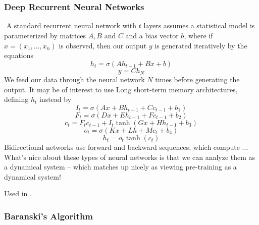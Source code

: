 \documentclass{article}
\begin{document}
​
%
​

​
\subsubsection{Deep Recurrent Neural Networks}
​
A standard recurrent neural network with $t$ layers assumes a statistical model is parameterized by matrices $A,B$ and $C$ and a bias vector $b$, where if $x = (x_1, \dots, x_n)$ is observed, then our output $y$ is generated iteratively by the equations
%
\[ h_t = \sigma(A h_{t-1} + B x + b) \]
%
\[ y = C h_N \]
%
We feed our data through the neural network $N$ times before generating the output.
It may be of interest to use Long short-term memory architectures, defining $h_t$ instead by
%
\[ I_t = \sigma(Ax + B h_{t-1} + C c_{t-1} + b_1) \]
%
\[ F_t = \sigma(Dx + E h_{t-1} + F c_{t-1} + b_2) \]
%
\[ c_t = F_t c_{t-1} + I_t \tanh(G x + H h_{t-1} + b_3) \]
%
\[ o_t = \sigma(K x + L h + M c_t + b_4) \]
%
\[ h_t = o_t \tanh(c_t) \]
​
Bidirectional networks use forward and backward sequences, which compute ...
​
What's nice about these types of neural networks is that we can analyze them as a dynamical system -- which matches up nicely as viewing pre-training as a dynamical system!

Used in \cite{Kelly}.

\subsubsection{Baranski's Algorithm}
\end{document}
